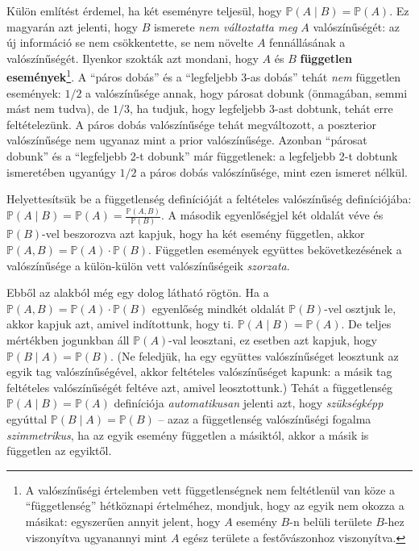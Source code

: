 \documentclass[magyar,]{book}
\let\rmarkdownfootnote\footnote%
\def\footnote{\protect\rmarkdownfootnote}
\begin{document}
Külön említést érdemel, ha két eseményre teljesül, hogy \(\mathbb{P}\left(A \mid B\right)=\mathbb{P}\left(A\right)\). Ez magyarán azt jelenti, hogy \(B\) ismerete \emph{nem változtatta meg} \(A\) valószínűségét: az új információ se nem csökkentette, se nem növelte \(A\) fennállásának a valószínűségét. Ilyenkor szokták azt mondani, hogy \(A\) és \(B\) \textbf{független események}\footnote{A valószínűségi értelemben vett függetlenségnek nem feltétlenül van köze a \enquote{függetlenség} hétköznapi értelméhez, mondjuk, hogy az egyik nem okozza a másikat: egyszerűen annyit jelent, hogy \(A\) esemény \(B\)-n belüli területe \(B\)-hez viszonyítva ugyanannyi mint \(A\) egész területe a festővászonhoz viszonyítva.}. A \enquote{páros dobás} és a \enquote{legfeljebb 3-as dobás} tehát \emph{nem} független események: \(1/2\) a valószínűsége annak, hogy párosat dobunk (önmagában, semmi mást nem tudva), de \(1/3\), ha tudjuk, hogy legfeljebb 3-ast dobtunk, tehát erre feltételezünk. A páros dobás valószínűsége tehát megváltozott, a poszterior valószínűsége nem ugyanaz mint a prior valószínűsége. Azonban \enquote{párosat dobunk} és a \enquote{legfeljebb 2-t dobunk} már függetlenek: a legfeljebb 2-t dobtunk ismeretében ugyanúgy \(1/2\) a páros dobás valószínűsége, mint ezen ismeret nélkül.

Helyettesítsük be a függetlenség definícióját a feltételes valószínűség definíciójába: \(\mathbb{P}\left(A \mid B\right) =\mathbb{P}\left(A\right)= \frac{\mathbb{P}\left(A,B\right)}{\mathbb{P}\left(B\right)}\). A második egyenlőségjel két oldalát véve és \(\mathbb{P}\left(B\right)\)-vel beszorozva azt kapjuk, hogy ha két esemény független, akkor \(\mathbb{P}\left(A,B\right)=\mathbb{P}\left(A\right)\cdot \mathbb{P}\left(B\right)\). Független események együttes bekövetkezésének a valószínűsége a külön-külön vett valószínűségeik \emph{szorzata}.

Ebből az alakból még egy dolog látható rögtön. Ha a \(\mathbb{P}\left(A,B\right)=\mathbb{P}\left(A\right)\cdot \mathbb{P}\left(B\right)\) egyenlőség mindkét oldalát \(\mathbb{P}\left(B\right)\)-vel osztjuk le, akkor kapjuk azt, amivel indítottunk, hogy ti. \(\mathbb{P}\left(A \mid B\right)=\mathbb{P}\left(A\right)\). De teljes mértékben jogunkban áll \(\mathbb{P}\left(A\right)\)-val leosztani, ez esetben azt kapjuk, hogy \(\mathbb{P}\left(B \mid A\right)=\mathbb{P}\left(B\right)\). (Ne feledjük, ha egy együttes valószínűséget leosztunk az egyik tag valószínűségével, akkor feltételes valószínűséget kapunk: a másik tag feltételes valószínűségét feltéve azt, amivel leosztottunk.) Tehát a függetlenség \(\mathbb{P}\left(A \mid B\right)=\mathbb{P}\left(A\right)\) definíciója \emph{automatikusan} jelenti azt, hogy \emph{szükségképp} egyúttal \(\mathbb{P}\left(B \mid A\right)=\mathbb{P}\left(B\right)\) -- azaz a függetlenség valószínűségi fogalma \emph{szimmetrikus}, ha az egyik esemény független a másiktól, akkor a másik is független az egyiktől.
\end{document}
